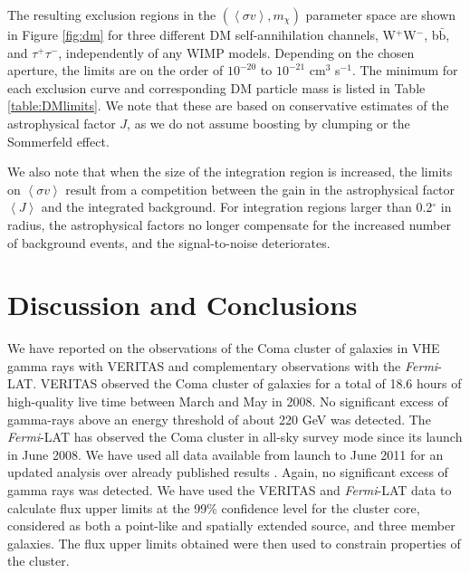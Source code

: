 \documentclass[12pt,manuscript]{aastex}
\newcommand{\expval}[1]{\left\langle #1 \right\rangle}
\begin{document}
The resulting exclusion regions in the $(\expval{\sigma v}, m_{\chi})$ parameter space are shown in
Figure \ref{fig:dm} for three different DM self-annihilation channels, W$^{+}$W$^{-}$,
b$\bar{\mathrm{b}}$, and $\tau^{+}\tau^{-}$, independently of any WIMP models. Depending on the
chosen aperture, the limits are on
the order of $10^{-20}$ to $10^{-21}$ cm$^{3}$ s$^{-1}$. The minimum for each exclusion curve and
corresponding DM particle mass is listed in Table \ref{table:DMlimits}. We note that these are
based on conservative estimates of the astrophysical factor $J$, as we do not assume boosting by
clumping or the Sommerfeld effect.

We also note that when the size of the integration region is increased, the limits on
$\expval{\sigma v}$ result from a competition between the gain in the astrophysical factor
$\expval{J}$ and the integrated background. For integration regions larger than 0.2$^{\circ}$ in
radius, the astrophysical factors no longer compensate for the increased number of background
events, and the signal-to-noise deteriorates.

%
%

\section{Discussion and Conclusions}
We have reported on the observations of the Coma cluster of galaxies in VHE gamma rays with VERITAS
and complementary observations with the \emph{Fermi}-LAT. VERITAS observed the Coma cluster of
galaxies for a total of 18.6 hours of high-quality live time between March and May in 2008. No
significant excess of gamma-rays above an energy threshold of about 220 GeV was detected. The
\emph{Fermi}-LAT has observed the Coma cluster in all-sky survey mode since its launch in June
2008. We have used all data available from launch to June 2011 for an updated analysis over already
published results \citep{article:Ackermann_etal:2010}. Again, no significant excess of gamma rays
was detected. We have used the VERITAS and \emph{Fermi}-LAT data to calculate flux upper limits at
the 99\% confidence level for the cluster core, considered as both a point-like and spatially
extended source, and three member galaxies. The flux upper limits obtained were then used to
constrain properties of the cluster.
\end{document}
